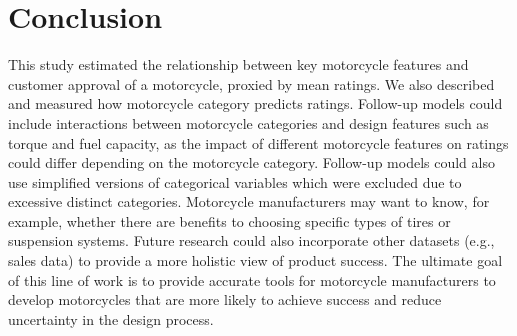 \documentclass[
]{article}
\begin{document}
\hypertarget{conclusion}{%
\section{Conclusion}\label{conclusion}}

This study estimated the relationship between key motorcycle features
and customer approval of a motorcycle, proxied by mean ratings. We also
described and measured how motorcycle category predicts ratings.
Follow-up models could include interactions between motorcycle
categories and design features such as torque and fuel capacity, as the
impact of different motorcycle features on ratings could differ
depending on the motorcycle category. Follow-up models could also use
simplified versions of categorical variables which were excluded due to
excessive distinct categories. Motorcycle manufacturers may want to
know, for example, whether there are benefits to choosing specific types
of tires or suspension systems. Future research could also incorporate
other datasets (e.g., sales data) to provide a more holistic view of
product success. The ultimate goal of this line of work is to provide
accurate tools for motorcycle manufacturers to develop motorcycles that
are more likely to achieve success and reduce uncertainty in the design
process.
\end{document}
